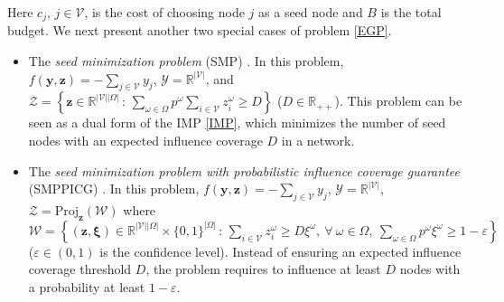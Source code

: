 \documentclass[a4paper,10pt]{article}
\newcommand{\V}{\mathcal{V}}
\theoremstyle{plain}
\newcommand{\bz}{{\boldsymbol{z}}}
\newcommand{\revv}[1]{{#1}}
\begin{document}
	Here $c_j$, $j \in \V$, is the cost of choosing node $j$ as a seed node and $B$ is the total budget.
	We next present another two special cases of problem \eqref{EGP}.
	\begin{itemize}
		\item The \emph{seed minimization problem} (SMP) \cite{Long2011}. In this problem, $f(\boldsymbol{y},\boldsymbol{z})=-\sum_{j\in\V}y_j$, $\mathcal{Y}=\mathbb{R}^{|\V|}$, and  $\mathcal{Z}=\left\{\boldsymbol{z}\in\mathbb{R}^{|\V||\Omega|}\,:\,\sum_{\omega\in\Omega}p^{\omega}\sum_{i\in\V}z_i^{\omega}\geq D\right\}$ ($D\in\mathbb{R}_{++}$). 
		This problem can be seen as a dual form of the IMP \eqref{IMP}, which minimizes the number of seed nodes with an expected influence coverage $D$ in a \revv{network}.
		\item The \emph{seed minimization problem with probabilistic influence coverage guarantee} (SMPPICG) \cite{Wu2019,Zhang2014}.
		In this problem, $f(\boldsymbol{y},\boldsymbol{z})=-\sum_{j\in\V}y_j$, $\mathcal{Y}=\mathbb{R}^{|\V|}$, $\mathcal{Z}=\text{Proj}_{\bz}(\mathcal{W}) $ where $\mathcal{W}= \left\{(\boldsymbol{z},\boldsymbol{\xi}) \in \mathbb{R}^{|\V||\Omega|}\times \{0,1\}^{|\Omega|}\,:\, \sum\limits_{i\in\V}z_i^{\omega}\geq D\xi^{\omega},~\forall~ \omega\in\Omega,~\sum\limits_{\omega\in\Omega}p^{\omega}\xi^{\omega}\geq 1-\varepsilon\right\}$ ($\varepsilon\in(0,1)$ is the confidence level).
		{Instead of ensuring an expected influence coverage threshold $D$, the problem requires to influence at least $D$ nodes with a probability at least $1-\varepsilon$.}
	\end{itemize}
	
\end{document}
